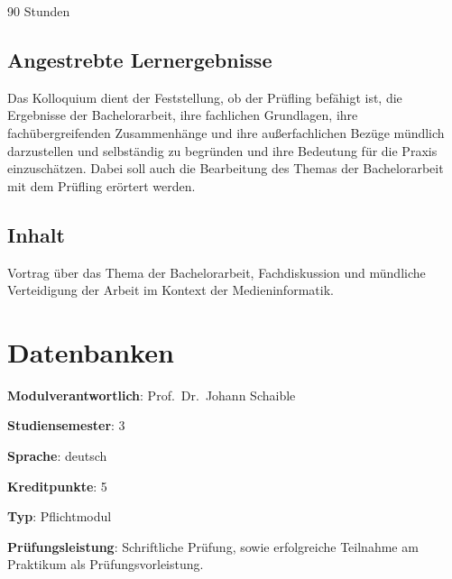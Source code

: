 90 Stunden

\hypertarget{angestrebte-lernergebnissepathlabelmi-2017modulbeschreibungen-bachelorba_bachelorkolloquium}{%
\section*{Angestrebte
Lernergebnisse\label{/mi-2017/modulbeschreibungen-bachelor/BA_Bachelorkolloquium}}\label{angestrebte-lernergebnissepathlabelmi-2017modulbeschreibungen-bachelorba_bachelorkolloquium}}

Das Kolloquium dient der Feststellung, ob der Prüfling befähigt ist, die
Ergebnisse der Bachelorarbeit, ihre fachlichen Grundlagen, ihre
fachübergreifenden Zusammenhänge und ihre außerfachlichen Bezüge
mündlich darzustellen und selbständig zu begründen und ihre Bedeutung
für die Praxis einzuschätzen. Dabei soll auch die Bearbeitung des Themas
der Bachelorarbeit mit dem Prüfling erörtert werden.

\hypertarget{inhaltpathlabelmi-2017modulbeschreibungen-bachelorba_bachelorkolloquium}{%
\section*{Inhalt\label{/mi-2017/modulbeschreibungen-bachelor/BA_Bachelorkolloquium}}\label{inhaltpathlabelmi-2017modulbeschreibungen-bachelorba_bachelorkolloquium}}

Vortrag über das Thema der Bachelorarbeit, Fachdiskussion und mündliche
Verteidigung der Arbeit im Kontext der Medieninformatik.

\hypertarget{datenbankenpathlabelmi-2017modulbeschreibungen-bachelorba_datenbanken1}{%
\chapter{Datenbanken\label{/mi-2017/modulbeschreibungen-bachelor/BA_Datenbanken1}}\label{datenbankenpathlabelmi-2017modulbeschreibungen-bachelorba_datenbanken1}}

\begin{modulHead}
\textbf{Modulverantwortlich}: Prof.~Dr.~Johann
Schaible
\end{modulHead}
\begin{modulHead}
\textbf{Studiensemester}:
3
\end{modulHead}
\begin{modulHead}
\textbf{Sprache}:
deutsch
\end{modulHead}
\begin{modulHead}
\textbf{Kreditpunkte}:
5
\end{modulHead}
\begin{modulHead}
\textbf{Typ}:
Pflichtmodul
\end{modulHead}
\begin{modulHead}
\textbf{Prüfungsleistung}:
Schriftliche Prüfung, sowie erfolgreiche Teilnahme am Praktikum als
Prüfungsvorleistung.
\end{modulHead}



